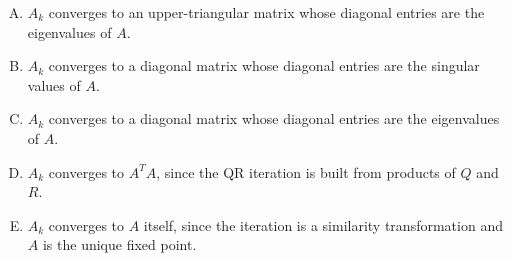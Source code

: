 \documentclass[12pt]{amsart}
\begin{document}
\begin{enumerate}[(A)]
\item $A_k$ converges to an upper-triangular matrix whose diagonal entries are the eigenvalues of $A$.
\item $A_k$ converges to a diagonal matrix whose diagonal entries are the singular values of $A$.
\item $A_k$ converges to a diagonal matrix whose diagonal entries are the eigenvalues of $A$.
\item $A_k$ converges to $A^T A$, since the QR iteration is built from products of $Q$ and $R$.
\item $A_k$ converges to $A$ itself, since the iteration is a similarity transformation and $A$ is the unique fixed point.
\end{enumerate}
\end{document}
